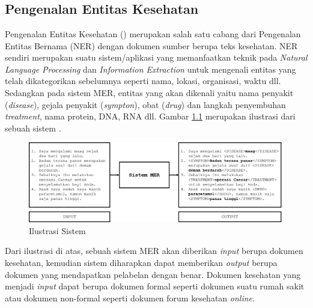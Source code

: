 \chapter{\babDua}

\section{Pengenalan Entitas Kesehatan}
Pengenalan Entitas Kesehatan (\mer) merupakan salah satu cabang dari Pengenalan Entitas Bernama (NER) dengan dokumen sumber berupa teks kesehatan. NER sendiri merupakan suatu sistem/aplikasi yang memanfaatkan teknik pada \textit{Natural Language Processing} dan \textit{Information Extraction} untuk mengenali entitas yang telah dikategorikan sebelumnya seperti nama, lokasi, organisasi, waktu dll. Sedangkan pada sistem MER, entitas yang akan dikenali yaitu nama penyakit (\textit{disease}), gejala penyakit (\textit{sympton}), obat (\textit{drug}) dan langkah penyembuhan \textit{treatment}, nama protein, DNA, RNA dll. Gambar \ref{fig:mer_ilustration} merupakan ilustrasi dari sebuah sistem \mer.

\begin{figure}
	\centering
	\includegraphics[width=1.0\linewidth]{images/mer_ilustration}
	\caption{Ilustrasi Sistem \mer}
	\label{fig:mer_ilustration}
\end{figure}

Dari ilustrasi di atas, sebuah sistem MER akan diberikan \textit{input} berupa dokumen kesehatan, kemudian sistem diharapkan dapat memberikan \textit{output} berupa dokumen yang mendapatkan pelabelan dengan benar. Dokumen kesehatan yang menjadi \textit{input} dapat berupa dokumen formal seperti dokumen suatu rumah sakit atau dokumen non-formal seperti dokumen forum kesehatan \textit{online}.

